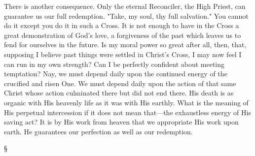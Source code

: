 \documentclass[12pt,a5paper,twoside,titlepage]{book}
\begin{document}
There is another consequence. Only the 
eternal Reconciler, the High Priest, can 
guarantee us our full redemption. "Take, my 
soul, thy full salvation." You cannot do it 
except you do it in such a Cross. It is not 
enough to have in the Cross a great demonstration 
of God's love, a forgiveness of the 
past which leaves us to fend for ourselves in 
the future. Is my moral power so great after 
all, then, that, supposing I believe past things 
were settled in Christ's Cross, I may now feel 
I can run in my own strength? Can I be 
perfectly confident about meeting temptation? 
Nay, we must depend daily upon the continued 
energy of the crucified and risen One. We 
must depend daily upon the action of that 
same Christ whose action culminated there 
but did not end there. His death is as organic 
with His heavenly life as it was with His 
earthly. What is the meaning of His perpetual 
intercession if it does not mean that---the 
exhaustless energy of His saving act? It is 
by His work from heaven that we appropriate 
His work upon earth. He guarantees our perfection 
as well as our redemption. 

\begin{center}
\S
\end{center}
\end{document}
